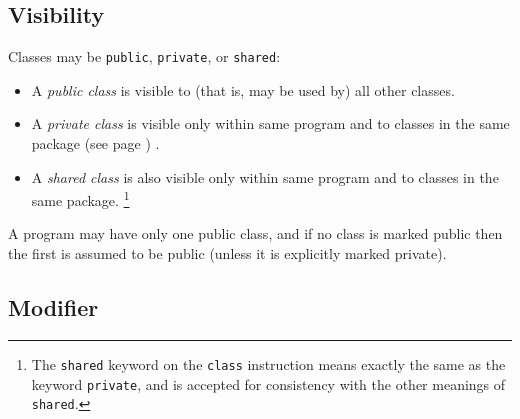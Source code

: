 \subsection{Visibility}
 
Classes may be \texttt{public}, \texttt{private}, or
\texttt{shared}:
\begin{itemize}
\item A \emph{public class} is visible to (that is, may be used by)
all other classes.
\item A \emph{private class} is visible only within same program and to
classes in the same  package (see page \pageref{refpackage}) .
\item A \emph{shared class} is also visible only within same program and to
classes in the same package.
\footnote{
The \texttt{shared} keyword on the \texttt{class} instruction means
exactly the same as the keyword \texttt{private}, and is accepted for
consistency with the other meanings of \texttt{shared}.
}
\end{itemize}
 
A program may have only one public class, and if no class is marked
public then the first is assumed to be public (unless it is explicitly
marked private).
\subsection{Modifier}
 
